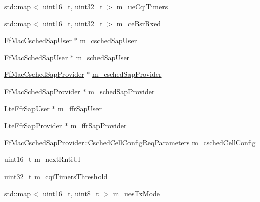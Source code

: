\begin{DoxyCompactItemize}
\item 
std\+::map$<$ uint16\+\_\+t, uint32\+\_\+t $>$ \hyperlink{classns3_1_1FdTbfqFfMacScheduler_a86890d454debae559e2a13f86c0b829c}{m\+\_\+ue\+Cqi\+Timers}
\item 
std\+::map$<$ uint16\+\_\+t, uint32\+\_\+t $>$ \hyperlink{classns3_1_1FdTbfqFfMacScheduler_a4affe9fe434a4cb87f5875ddf1766d61}{m\+\_\+ce\+Bsr\+Rxed}
\item 
\hyperlink{classns3_1_1FfMacCschedSapUser}{Ff\+Mac\+Csched\+Sap\+User} $\ast$ \hyperlink{classns3_1_1FdTbfqFfMacScheduler_ae7f6560bf03534df3702164a74da8309}{m\+\_\+csched\+Sap\+User}
\item 
\hyperlink{classns3_1_1FfMacSchedSapUser}{Ff\+Mac\+Sched\+Sap\+User} $\ast$ \hyperlink{classns3_1_1FdTbfqFfMacScheduler_adba18bbdd7247045a60bda41322253c5}{m\+\_\+sched\+Sap\+User}
\item 
\hyperlink{classns3_1_1FfMacCschedSapProvider}{Ff\+Mac\+Csched\+Sap\+Provider} $\ast$ \hyperlink{classns3_1_1FdTbfqFfMacScheduler_ab9204a4d0edccb863de0f60b2d818c4d}{m\+\_\+csched\+Sap\+Provider}
\item 
\hyperlink{classns3_1_1FfMacSchedSapProvider}{Ff\+Mac\+Sched\+Sap\+Provider} $\ast$ \hyperlink{classns3_1_1FdTbfqFfMacScheduler_ac42b10eec7e048dc14078359273ffeeb}{m\+\_\+sched\+Sap\+Provider}
\item 
\hyperlink{classns3_1_1LteFfrSapUser}{Lte\+Ffr\+Sap\+User} $\ast$ \hyperlink{classns3_1_1FdTbfqFfMacScheduler_a33331ad1347d0db07f6b6bce134ff7bf}{m\+\_\+ffr\+Sap\+User}
\item 
\hyperlink{classns3_1_1LteFfrSapProvider}{Lte\+Ffr\+Sap\+Provider} $\ast$ \hyperlink{classns3_1_1FdTbfqFfMacScheduler_a15bcdfbb46c65cae0d42e26b321f7827}{m\+\_\+ffr\+Sap\+Provider}
\item 
\hyperlink{structns3_1_1FfMacCschedSapProvider_1_1CschedCellConfigReqParameters}{Ff\+Mac\+Csched\+Sap\+Provider\+::\+Csched\+Cell\+Config\+Req\+Parameters} \hyperlink{classns3_1_1FdTbfqFfMacScheduler_a73d5d866713fa06e1cc6186b0f556693}{m\+\_\+csched\+Cell\+Config}
\item 
uint16\+\_\+t \hyperlink{classns3_1_1FdTbfqFfMacScheduler_adcaedd73d9597af47782db5e9f605544}{m\+\_\+next\+Rnti\+Ul}
\item 
uint32\+\_\+t \hyperlink{classns3_1_1FdTbfqFfMacScheduler_a5699ce6b376d8919bd386101b5c55e4a}{m\+\_\+cqi\+Timers\+Threshold}
\item 
std\+::map$<$ uint16\+\_\+t, uint8\+\_\+t $>$ \hyperlink{classns3_1_1FdTbfqFfMacScheduler_a08550374df1be10395aa320fc1722066}{m\+\_\+ues\+Tx\+Mode}

\end{DoxyCompactItemize}
